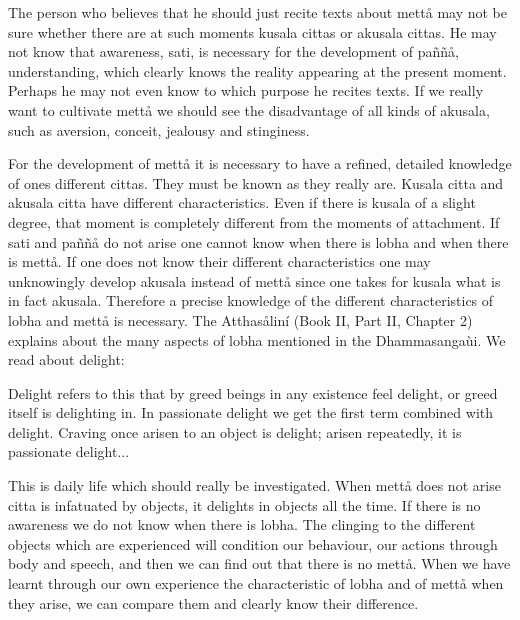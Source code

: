 \documentclass[12pt,twoside]{article}
\begin{document}
The person who believes that he should just recite texts about mett{\aa}
may not be sure whether there are at such moments kusala cittas or
akusala cittas. He may not know that awareness, sati, is necessary for
the development of pa\~n\~n{\aa}, understanding, which clearly knows
the reality appearing at the present moment. Perhaps he may not even
know to which purpose he recites texts. If we really want to cultivate
mett{\aa} we should see the disadvantage of all kinds of akusala, such
as aversion, conceit, jealousy and stinginess. 

For the development of mett{\aa} it is necessary to have a refined,
detailed knowledge of one{\textquotesingle}s different cittas. They
must be known as they really are. Kusala citta and akusala citta have
different characteristics. Even if there is kusala of a slight degree,
that moment is completely different from the moments of attachment. If
sati and pa\~n\~n{\aa} do not arise one cannot know when there is lobha
and when there is mett{\aa}. If one does not know their different
characteristics one may unknowingly develop akusala instead of
mett{\aa} since one takes for kusala what is in fact akusala. Therefore
a precise knowledge of the different characteristics of lobha and
mett{\aa} is necessary. The Atthas{\aa}lin\'i (Book II, Part II,
Chapter 2) explains about the many aspects of lobha mentioned in the
Dhammasanga\`ui. We read about
{\textasciigrave}{\textasciigrave}delight{\textquotesingle}{\textquotesingle}:


\bigskip

{\textasciigrave}{\textasciigrave}Delight{\textquotesingle}{\textquotesingle}
refers to this that by greed beings in any existence feel delight, or
greed itself is delighting in. In
{\textasciigrave}{\textasciigrave}passionate
delight{\textquotesingle}{\textquotesingle} we get the first term
combined with delight. Craving once arisen to an object is
{\textasciigrave}{\textasciigrave}delight{\textquotesingle}{\textquotesingle};
arisen repeatedly, it is {\textasciigrave}{\textasciigrave}passionate
delight{\textquotesingle}{\textquotesingle}...


\bigskip

This is daily life which should really be investigated. When mett{\aa}
does not arise citta is infatuated by objects, it delights in objects
all the time. If there is no awareness we do not know when there is
lobha. The clinging to the different objects which are experienced will
condition our behaviour, our actions through body and speech, and then
we can find out that there is no mett{\aa}. When we have learnt through
our own experience the characteristic of lobha and of mett{\aa} when
they arise, we can compare them and clearly know their difference. 
\end{document}
